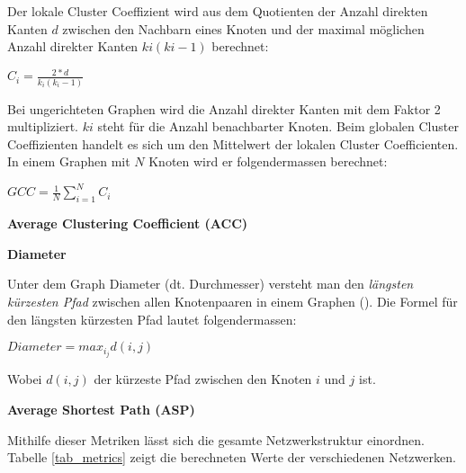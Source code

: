 Der lokale Cluster Coeffizient wird aus dem Quotienten der Anzahl direkten Kanten $d$ zwischen den Nachbarn eines Knoten und der maximal möglichen Anzahl direkter Kanten $ki(ki -1)$ berechnet:

$C_i = \frac{2*d}{k_i(k_i-1)}$

Bei ungerichteten Graphen wird die Anzahl direkter Kanten mit dem Faktor 2 multipliziert. $ki$ steht für die Anzahl benachbarter Knoten.
Beim globalen Cluster Coeffizienten handelt es sich um den Mittelwert der lokalen Cluster Coefficienten.
In einem Graphen mit $N$ Knoten wird er folgendermassen berechnet:

$GCC = \frac{1}{N}\sum\limits_{i=1}^{N}C_i$

\textbf{Average Clustering Coefficient (ACC)}

\textbf{Diameter}

Unter dem Graph Diameter (dt. Durchmesser) versteht man den \textit{längsten kürzesten Pfad} zwischen allen Knotenpaaren in einem Graphen (\cite{michael_henninger_soziale_2018}).
Die Formel für den längsten kürzesten Pfad lautet folgendermassen:

$Diameter = max_i_jd(i,j)$

Wobei $d(i,j)$ der kürzeste Pfad zwischen den Knoten $i$ und $j$ ist.

\textbf{Average Shortest Path (ASP)}


Mithilfe dieser Metriken lässt sich die gesamte Netzwerkstruktur einordnen.
Tabelle \ref{tab_metrics} zeigt die berechneten Werte der verschiedenen Netzwerken.

\begin{table}[h]
    \centering
    \caption{Metrikwerte der Netzwerke}
    \label{tab_metrics}
\end{table}
